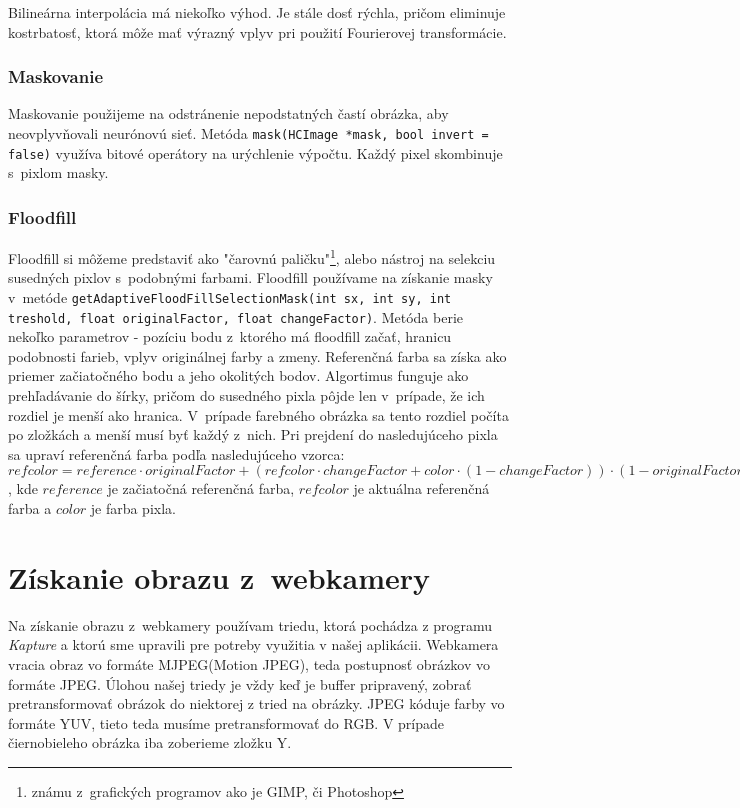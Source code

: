 Bilineárna interpolácia má niekoľko výhod. Je stále dosť rýchla, pričom eliminuje kostrbatosť, ktorá môže mať výrazný vplyv pri použití Fourierovej transformácie.

\subsubsection{Maskovanie}
Maskovanie použijeme na odstránenie nepodstatných častí obrázka, aby neovplyvňovali neurónovú sieť. Metóda {\tt mask(HCImage *mask, bool invert = false)} využíva bitové operátory na urýchlenie výpočtu. Každý pixel skombinuje s~pixlom masky. 

\subsubsection{Floodfill}
Floodfill si môžeme predstaviť ako "čarovnú paličku"\footnote{známu z~grafických programov ako je GIMP, či Photoshop}, alebo nástroj na selekciu susedných pixlov s~podobnými farbami. Floodfill používame na získanie masky v~metóde {\tt getAdaptiveFloodFillSelectionMask(int sx, int sy, int treshold, float originalFactor, float changeFactor)}. Metóda berie nekoľko parametrov - pozíciu bodu z~ktorého má floodfill začať, hranicu podobnosti farieb, vplyv originálnej farby a zmeny. Referenčná farba sa získa ako priemer začiatočného bodu a jeho okolitých bodov. Algortimus funguje ako prehľadávanie do šírky, pričom do susedného pixla pôjde len v~prípade, že ich rozdiel je menší ako hranica. V~prípade farebného obrázka sa tento rozdiel počíta po zložkách a menší musí byť každý z~nich. Pri prejdení do nasledujúceho pixla sa upraví referenčná farba podľa nasledujúceho vzorca: $refcolor = reference \cdot originalFactor + (refcolor\cdot changeFactor+color \cdot (1-changeFactor)) \cdot (1-originalFactor)$, kde $reference$ je začiatočná referenčná farba, $refcolor$ je aktuálna referenčná farba a $color$ je farba pixla.

\section{Získanie obrazu z~webkamery}
Na získanie obrazu z~webkamery používam triedu, ktorá pochádza z programu \textit{Kapture} \cite{kapture} a ktorú sme upravili pre potreby využitia v našej aplikácii. Webkamera vracia obraz vo formáte MJPEG(Motion JPEG), teda postupnosť obrázkov vo formáte JPEG. Úlohou našej triedy je vždy keď je buffer pripravený, zobrať pretransformovať obrázok do niektorej z tried na obrázky. JPEG kóduje farby vo formáte YUV, tieto teda musíme pretransformovať do RGB. V prípade čiernobieleho obrázka iba zoberieme zložku Y.

